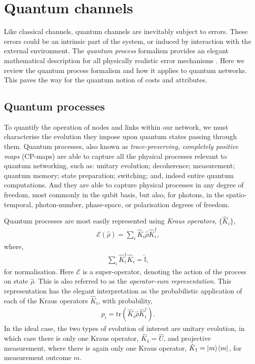 %
%

\section{Quantum channels} \label{sec:quant_chan} 

Like classical channels, quantum channels are inevitably subject to errors. These errors could be an intrinsic part of the system, or induced by interaction with the external environment. The \textit{quantum process} formalism provides an elegant mathematical description for all physically realistic error mechanisms \cite{bib:NielsenChuang00, bib:Gilchrist05}. Here we review the quantum process formalism and how it applies to quantum networks. This paves the way for the quantum notion of costs and attributes.


%
%

\subsection{Quantum processes} 

To quantify the operation of nodes and links within our network, we must characterise the evolution they impose upon quantum states passing through them. Quantum processes, also known as \textit{trace-preserving, completely positive maps} (CP-maps) are able to capture all the physical processes relevant to quantum networking, such as: unitary evolution; decoherence; measurement; quantum memory; state preparation; switching; and, indeed entire quantum computations. And they are able to capture physical processes in any degree of freedom, most commonly in the qubit basis, but also, for photons, in the spatio-temporal, photon-number, phase-space, or polarisation degrees of freedom.

Quantum processes are most easily represented using \textit{Kraus operators}, $\{\hat{K}_i\}$,
\begin{align} \label{eq:kraus_rep}
\mathcal{E}(\hat\rho) = \sum_i \hat{K}_i \hat\rho \hat{K}_i^\dag,
\end{align}
where,
\begin{align}
\sum_i \hat{K}_i^\dag \hat{K}_i = \hat{\mathbb{I}},
\end{align}
for normalisation. Here $\mathcal{E}$ is a super-operator, denoting the action of the process on state $\hat\rho$. This is also referred to as the \textit{operator-sum representation}. This representation has the elegant interpretation as the probabilistic application of each of the Kraus operators $\hat{K}_i$, with probability,
\begin{align}
p_i = \text{tr}(\hat{K}_i \hat\rho \hat{K}_i^\dag).
\end{align}
In the ideal case, the two types of evolution of interest are unitary evolution, in which case there is only one Kraus operator, \mbox{$\hat{K}_1=\hat{U}$}, and projective measurement, where there is again only one Kraus operator, \mbox{$\hat{K}_1=|m\rangle\langle m|$}, for measurement outcome $m$.

